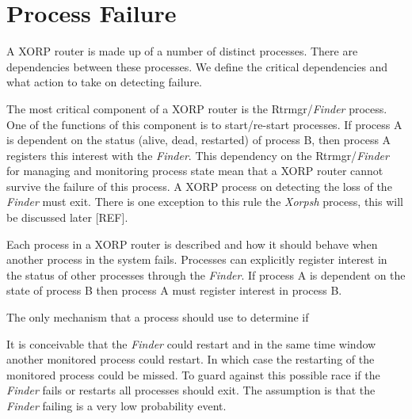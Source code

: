 \documentclass[11pt]{article}
\makeatletter
\newcommand{\finder} {{\em Finder}\@\xspace}
\newcommand{\xorpsh} {{\em Xorpsh}\@\xspace}
\makeatother
\begin{document}
\section{\label{pfailure}Process Failure}

A XORP router is made up of a number of distinct processes. There are
dependencies between these processes. We define the critical
dependencies and what action to take on detecting failure.

The most critical component of a XORP router is the Rtrmgr/\finder
process. One of the functions of this component is to start/re-start
processes. If process A is dependent on the status (alive, dead,
restarted) of process B, then process A registers this interest with
the \finder. This dependency on the Rtrmgr/\finder for managing and
monitoring process state mean that a XORP router cannot survive the
failure of this process. A XORP process on detecting the loss of the
\finder must exit. There is one exception to this rule the \xorpsh
process, this will be discussed later [REF].



Each process in a XORP router is described and how it should behave
when another process in the system fails. Processes can explicitly
register interest in the status of other processes through the
\finder. If process A is dependent on the state of process B then
process A must register interest in process B.

The only mechanism that a process should use to determine if 

It is conceivable that the \finder could restart and in the same time
window another monitored process could restart. In which case the
restarting of the monitored process could be missed. To guard against
this possible race if the \finder fails or restarts all processes
should exit. The assumption is that the \finder failing is a very low
probability event.
\end{document}
